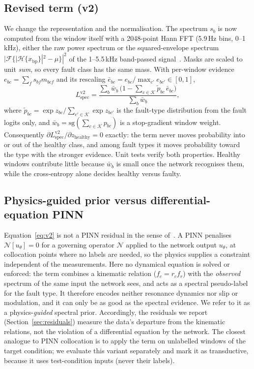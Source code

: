 \documentclass[conference]{IEEEtran}
\newcommand{\Lspec}{L_{\mathrm{spec}}}
\begin{document}
\subsection{Revised term (v2)}
We change the representation and the normalisation. The spectrum $s_b$ is now
computed from the window itself with a 2048-point Hann FFT (5.9\,Hz bins,
0--1\,kHz), either the raw power spectrum or the squared-envelope spectrum
$|\mathcal F\{|\mathcal H\{x_{\mathrm{bp}}\}|^2-\mu\}|^2$ of the 1--5.5\,kHz
band-passed signal~\cite{randall2011}. Masks are scaled to unit \emph{sum}, so
every fault class has the same mass. With per-window evidence
$e_{bc}=\sum_f s_{bf} m_{bcf}$ and its rescaling
$\bar e_{bc}=e_{bc}/\max_{c'}e_{bc'}\in[0,1]$,
\begin{equation}
\Lspec^{\mathrm{v2}}=\frac{\sum_b \bar w_b\,\bigl(1-\sum_{c\in\mathcal K}\tilde p_{bc}\,\bar e_{bc}\bigr)}{\sum_b \bar w_b},
\label{eq:v2}
\end{equation}
where $\tilde p_{bc}=\exp z_{bc}/\sum_{c'\in\mathcal K}\exp z_{bc'}$ is the
fault-type distribution from the fault logits only, and
$\bar w_b=\mathrm{sg}(\sum_{c\in\mathcal K}p_{bc})$ is a stop-gradient window
weight. Consequently $\partial\Lspec^{\mathrm{v2}}/\partial z_{\mathrm{healthy}}=0$
exactly: the term never moves probability into or out of the healthy class,
and among fault types it moves probability toward the type with the stronger
evidence. Unit tests verify both properties.
Healthy windows contribute little because $\bar w_b$ is small once the network
recognises them, while the cross-entropy alone decides healthy versus faulty.

\subsection{Physics-guided prior versus differential-equation PINN}
\label{sec:notpinn}
Equation~\eqref{eq:v2} is not a PINN residual in the sense of~\cite{raissi2019}.
A PINN penalises $\mathcal N[u_\theta]=0$ for a governing operator $\mathcal N$
applied to the network output $u_\theta$, at collocation points where no labels
are needed, so the physics supplies a constraint independent of the
measurements. Here no dynamical equation is solved or enforced: the term
combines a kinematic relation ($f_c=r_c f_r$) with the \emph{observed} spectrum
of the same input the network sees, and acts as a spectral pseudo-label for the
fault type. It therefore encodes neither resonance dynamics nor slip or
modulation, and it can only be as good as the spectral evidence. We refer to
it as a physics-\emph{guided} spectral prior. Accordingly, the residuals we
report (Section~\ref{sec:residuals}) measure the data's departure from the
kinematic relations, not the violation of a differential equation by the
network. The closest analogue to PINN
collocation is to apply the term on unlabelled windows of the target
condition; we evaluate this variant separately and mark it as transductive,
because it uses test-condition inputs (never their labels).
\end{document}
